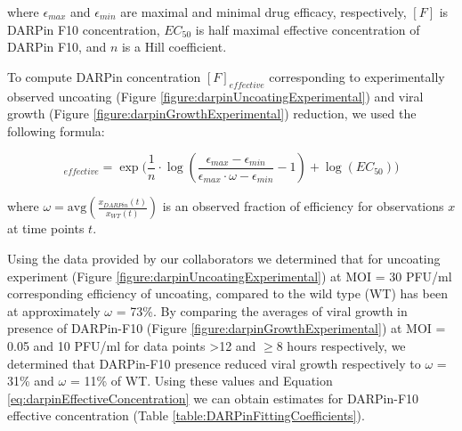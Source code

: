 where $\epsilon_{max}$ and $\epsilon_{min}$ are maximal and minimal drug efficacy, respectively, $[F]$ is DARPin F10 concentration, $EC_{50}$ is half maximal effective concentration of DARPin F10, and $n$ is a Hill coefficient.

To compute DARPin concentration $[F]_{effective}$ corresponding to experimentally observed uncoating (Figure \ref{figure:darpinUncoatingExperimental}) and viral growth (Figure \ref{figure:darpinGrowthExperimental}) reduction, we used the following formula:

\begin{equation}
[F]_{effective} = \exp\big( \frac{1}{n}\cdot\log( \frac{\epsilon_{max}-\epsilon_{min}}{\epsilon_{max}\cdot\omega - \epsilon_{min}} - 1 ) +\log(EC_{50}) \big)
\label{eq:darpinEffectiveConcentration}
\end{equation}

where $\omega = \text{avg}(\frac{x_{DARPin}(t)}{x_{WT}(t)})$ is an observed fraction of efficiency for observations $x$ at time points $t$.

Using the data \cite{DarpinData} provided by our collaborators we determined that for uncoating experiment (Figure \ref{figure:darpinUncoatingExperimental}) at MOI = 30 PFU/ml corresponding efficiency of uncoating, compared to the wild type (WT) has been at approximately $\omega$ = 73\%. By comparing the averages of viral growth in presence of DARPin-F10 (Figure \ref{figure:darpinGrowthExperimental}) at MOI = 0.05 and 10 PFU/ml for data points >12 and $\ge$8 hours respectively, we determined that DARPin-F10 presence reduced viral growth respectively to $\omega$ = 31\% and $\omega$ = 11\% of WT. Using these values and Equation \ref{eq:darpinEffectiveConcentration} we can obtain estimates for DARPin-F10 effective concentration (Table \ref{table:DARPinFittingCoefficients}).

